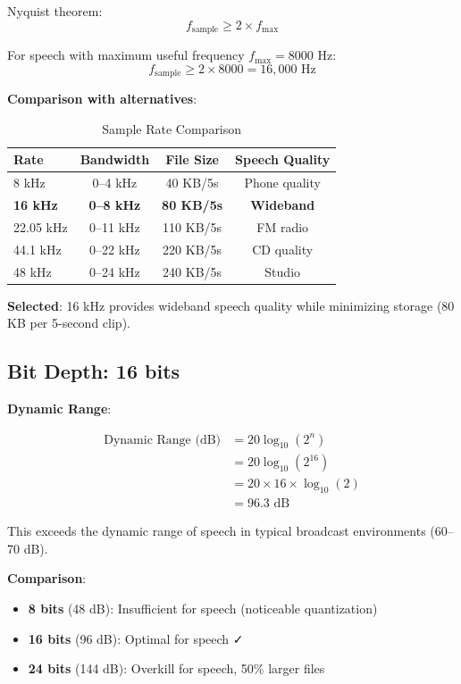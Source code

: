 \documentclass[11pt,a4paper]{article}
\begin{document}
Nyquist theorem:
\begin{equation}
f_{\text{sample}} \geq 2 \times f_{\text{max}}
\end{equation}

For speech with maximum useful frequency $f_{\text{max}} = 8000$ Hz:
\begin{equation}
f_{\text{sample}} \geq 2 \times 8000 = 16{,}000 \text{ Hz}
\end{equation}

\textbf{Comparison with alternatives}:

\begin{table}[htbp]
\centering
\caption{Sample Rate Comparison}
\begin{tabular}{@{}lccc@{}}
\toprule
\textbf{Rate} & \textbf{Bandwidth} & \textbf{File Size} & \textbf{Speech Quality} \\ \midrule
8 kHz & 0--4 kHz & 40 KB/5s & Phone quality \\
\textbf{16 kHz} & \textbf{0--8 kHz} & \textbf{80 KB/5s} & \textbf{Wideband} \\
22.05 kHz & 0--11 kHz & 110 KB/5s & FM radio \\
44.1 kHz & 0--22 kHz & 220 KB/5s & CD quality \\
48 kHz & 0--24 kHz & 240 KB/5s & Studio \\
\bottomrule
\end{tabular}
\end{table}

\textbf{Selected}: 16 kHz provides wideband speech quality while minimizing storage (80 KB per 5-second clip).

\subsection{Bit Depth: 16 bits}

\textbf{Dynamic Range}:

\begin{align}
\text{Dynamic Range (dB)} &= 20 \log_{10}(2^n) \\
&= 20 \log_{10}(2^{16}) \\
&= 20 \times 16 \times \log_{10}(2) \\
&= 96.3 \text{ dB}
\end{align}

This exceeds the dynamic range of speech in typical broadcast environments (60--70 dB).

\textbf{Comparison}:
\begin{itemize}
    \item \textbf{8 bits} (48 dB): Insufficient for speech (noticeable quantization)
    \item \textbf{16 bits} (96 dB): Optimal for speech ✓
    \item \textbf{24 bits} (144 dB): Overkill for speech, 50\% larger files
\end{itemize}
\end{document}
